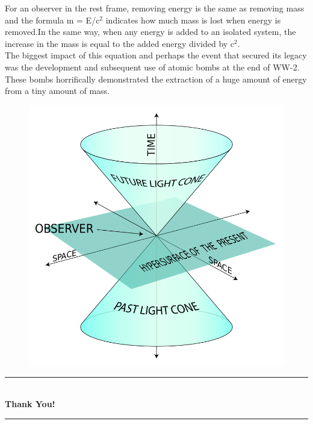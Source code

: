 \documentclass[12pt]{article}
\begin{document}
For an observer in the rest frame, removing energy is the same as removing mass and the formula m = E/c$^2$ indicates how much mass is lost when energy is removed.In the same way, when any energy is added to an isolated system, the increase in the mass is equal to the added energy divided by c$^2$.\\[0.3 cm]
The biggest impact of this equation and perhaps the event that secured its legacy was the development and subsequent use of atomic bombs at the end of WW-2. These bombs horrifically demonstrated the extraction of a huge amount of energy from a tiny amount of mass.\\

\begin{figure} [h!]
    \centering
    \includegraphics[scale = 0.3]{20.png}
\end{figure}
\centering
	\rule{\linewidth}{0.3 mm} \\[0.4 cm]
	{ \huge \bfseries Thank You!}\\
	\rule{\linewidth}{0.2 mm} \\[0.5 cm]
\end{document}
